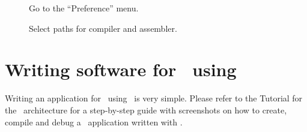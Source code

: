 \begin{figure}[htb]
\caption{Go to the ``Preference'' menu.}
\label{fig:preferences-menu}
\end{figure}

\begin{figure}[htb]
\caption{Select paths for compiler and assembler.}
\label{fig:preferences-avr5}
\end{figure}


\section{Writing software for \avr\ using \ee}

\begin{note}
Writing an application for \avr\ using \ee\ is
very simple. Please refer to the \ee Tutorial for the \avr\
architecture for a step-by-step guide with screenshots on how to
create, compile and debug a \avr\ application written with \ee.
\end{note}

